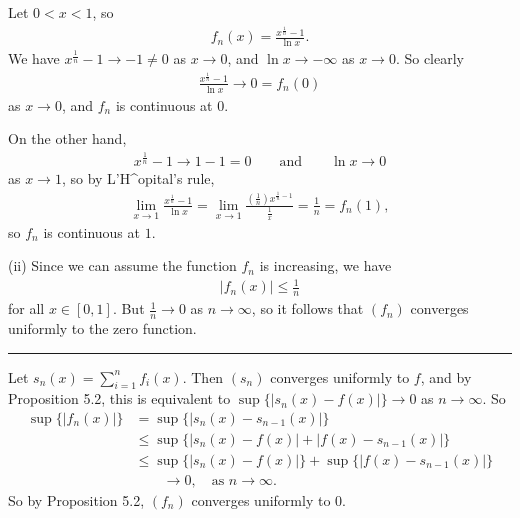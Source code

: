 \documentclass[letterpaper,10pt,english]{jupyterBook}
\begin{document}
Let \(0<x<1\), so
\begin{equation*}
\begin{split}
f_n(x) = \frac{x^{\frac{1}{n}}-1}{\ln x}.
\end{split}
\end{equation*}
\sphinxAtStartPar
We have \(x^{\frac{1}{n}} -1 \rightarrow -1 \neq 0\) as \(x\rightarrow 0\), and \(\ln x\rightarrow -\infty\) as \(x\rightarrow 0\). So clearly
\begin{equation*}
\begin{split}
\frac{x^{\frac{1}{n}}-1}{\ln x} \rightarrow 0 =f_n(0)
\end{split}
\end{equation*}
\sphinxAtStartPar
as \(x\rightarrow 0\), and \(f_n\) is continuous at \(0\).

On the other hand,
\begin{equation*}
\begin{split}
x^{\frac{1}{n}} -1 \rightarrow 1-1=0 \qquad \text{and}\qquad \ln x\rightarrow 0
\end{split}
\end{equation*}
\sphinxAtStartPar
as \(x\rightarrow 1\), so by L’H\textasciicircum{}opital’s rule,
\begin{equation*}
\begin{split}
\lim_{x\rightarrow 1} \frac{x^{\frac{1}{n}} -1}{\ln x} = \lim_{x\rightarrow 1} \frac{\left(\frac{1}{n}\right)x^{\frac{1}{n}-1}}{\frac{1}{x}} = \frac{1}{n} = f_n(1),
\end{split}
\end{equation*}
\sphinxAtStartPar
so  \(f_n\) is continuous at \(1\).

\sphinxAtStartPar
(ii) Since we can assume the function \(f_n\) is increasing, we have
\begin{equation*}
\begin{split}
|f_n(x) |\leq \frac{1}{n}
\end{split}
\end{equation*}
\sphinxAtStartPar
for all \(x\in [0,1]\). But \(\frac{1}{n}\rightarrow 0\) as \(n\rightarrow \infty\), so it follows that \((f_n)\) converges uniformly to the zero function.


\bigskip\hrule\bigskip


\sphinxAtStartPar
{\hyperref[\detokenize{Problems:id60}]{}} Let \(s_n(x)=\sum_{i=1}^n f_i(x)\). Then \((s_n)\) converges uniformly to \(f\), and by Proposition 5.2, this is equivalent to \(\sup\{|s_n(x)-f(x)|\}\to 0\) as \(n\to\infty\). So
\begin{align*}
\sup\{|f_n(x)|\}&=\sup\{|s_n(x)-s_{n-1}(x)|\}\\
&\leq \sup \{|s_n(x)-f(x)|+|f(x)-s_{n-1}(x)|\}\\
&\leq \sup \{|s_n(x)-f(x)|\}+\sup\{|f(x)-s_{n-1}(x)|\}\\
&\qquad\to 0, \quad\text{as $n\to\infty$.}
\end{align*}
\sphinxAtStartPar
So by Proposition 5.2, \((f_n)\) converges uniformly to \(0\).
\end{document}
